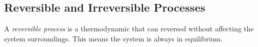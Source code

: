 \subsection{Reversible and Irreversible Processes}\label{subsec:Reversible_Irreversible_Processes}
\begin{definition}\label{def:Reversible_Process}
  A \emph{reversible process} is a thermodynamic  that can reversed without affecting the system surroundings.
  This means the system is always in equilibrium.
\end{definition}


